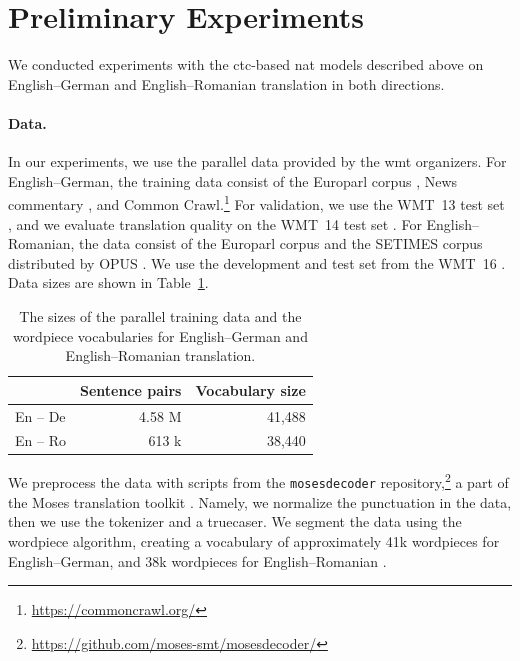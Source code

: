 \section{Preliminary Experiments}%
\label{sec:ctc:experiments}

We conducted experiments with the \ac{ctc}-based \ac{nat} models described
above on English--German and English--Romanian translation in both directions.

\paragraph{Data.}
In our experiments, we use the parallel data provided by the \ac{wmt}
organizers. For English--German, the training data consist of the Europarl
corpus \citep{koehn-2005-europarl}, News commentary
\citep{tiedemann-2012-parallel}, and Common
Crawl.\footnote{\url{https://commoncrawl.org/}} For validation, we use the
WMT~13 test set \citep{bojar-etal-2013-findings}, and we evaluate translation
quality on the WMT~14 test set \citep{bojar-etal-2014-findings}. For
English--Romanian, the data consist of the Europarl corpus and the SETIMES
corpus distributed by OPUS \citep{tiedemann-2012-parallel}. We use the
development and test set from the WMT~16 \citep{bojar-etal-2016-findings}. Data
sizes are shown in Table~\ref{tab:end-to-end:data}.

\begin{table}
  \centering
  \begin{tabular}{lrr}
    \toprule
     & Sentence pairs & Vocabulary size \\
    \midrule
    En -- De & 4.58 M & 41,488 \\
    En -- Ro & 613 k & 38,440 \\
    \bottomrule
  \end{tabular}

  \caption{The sizes of the parallel training data and the wordpiece
    vocabularies for English--German and English--Romanian translation.}%
  \label{tab:end-to-end:data}
\end{table}

We preprocess the data with scripts from the \texttt{mosesdecoder}
repository,\footnote{\url{https://github.com/moses-smt/mosesdecoder/}} a part
of the Moses translation toolkit \citep{koehn-etal-2007-moses}. Namely, we
normalize the punctuation in the data, then we use the tokenizer and a
truecaser. We segment the data using the wordpiece algorithm, creating a
vocabulary of approximately 41k wordpieces for English--German, and 38k
wordpieces for English--Romanian \citep{wu2016google}.


